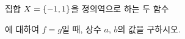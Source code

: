 집합 $X=\{-1{,}\mkern3mu\mathopen{}1\}$을 정의역으로 하는 두 함수 \par\smallskip{}\par\smallskip\noindent 에 대하여 $f=g$일 때, 상수 $a$, $b$의 값을 구하시오.
